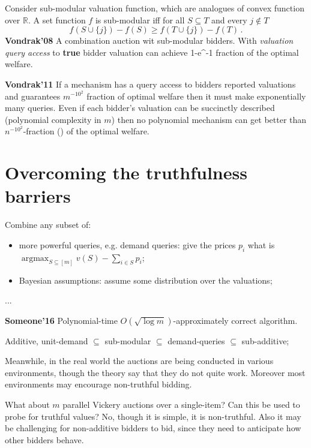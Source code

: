 \documentclass[a4paper]{article}
\newcommand{\Real}{\mathbb{R}}
\newcommand{\argmax}{\mathop{\text{argmax}}}
\begin{document}
Consider sub-modular valuation function, which are analogues of convex function over
$\Real$. A set function $f$ is sub-modular iff for all $S\subseteq T$ and every $j\notin T$
\begin{equation}
	f(S\cup\{j\}) - f(S) \geq f(T\cup\{j\}) - f(T)\,.
\end{equation}
\textbf{Vondrak'08} A combination auction wit sub-modular bidders. With \emph{valuation
query access} to \textbf{true} bidder valuation can achieve 1-e^{-1} fraction of the
optimal welfare.

\textbf{Vondrak'11} If a mechanism has a query access to bidders reported valuations and
guarantees $m^{-10^2}$ fraction of optimal welfare then it must make exponentially many
queries. Even if each bidder's valuation can be succinctly described (polynomial complexity
in $m$) then no polynomial mechanism can get better than $n^{-10^2}$-fraction (\wat) of the
optimal welfare.


\section{Overcoming the truthfulness barriers} %
\label{sec:overcoming_the_truthfulness_barriers}

Combine any subset of:\begin{itemize}
	\item more powerful queries, e.g. demand queries: give the prices $p_i$
	what is $\argmax_{S\subseteq [m]} v(S) - \sum_{i\in S} p_i$;
	\item Bayesian assumptions: assume some distribution over the valuations;
\end{itemize}

\noindent ...

\textbf{Someone'16} Polynomial-time $O(\sqrt{\log m})$-approximately correct
algorithm.

Additive, unit-demand $\subseteq$ sub-modular
$\subseteq$ demand-queries
$\subseteq$ sub-additive;

Meanwhile, in the real world the auctions are being conducted in various environments,
though the theory say that they do not quite work. Moreover most environments may encourage
non-truthful bidding.

What about $m$ parallel Vickery auctions over a single-item? Can this be used to
probe for truthful values? No, though it is simple, it is non-truthful. Also it may
be challenging for non-additive bidders to bid, since they need to anticipate how
other bidders behave.
\end{document}
